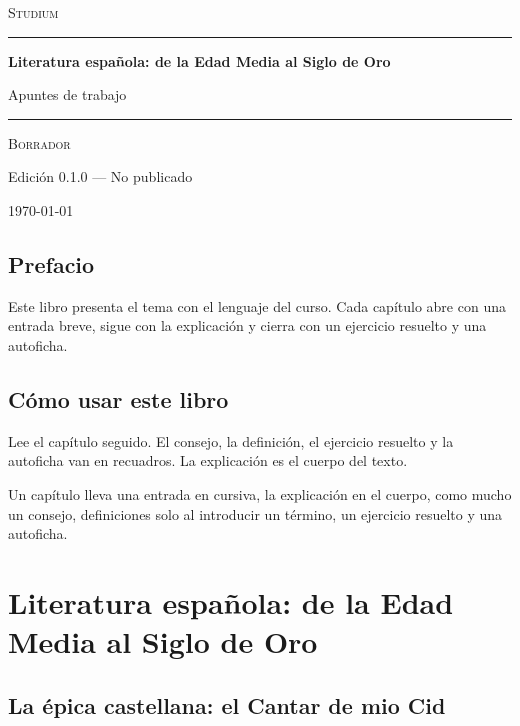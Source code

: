 \documentclass{book}
\begin{document}
\frontmatter
\ifdefined\studiumcustomtitle
\studiumcustomtitle
\else
\thispagestyle{empty}
\setlength{\parindent}{0pt}
\vspace*{0.08\textheight}
{\normalsize\scshape\color{studiumInk} Studium\par}
\vspace{0.55em}
{\color{studiumRule}\rule{\linewidth}{0.9pt}\par}
\vspace{0.16\textheight}
{\raggedright\Huge\bfseries Literatura española: de la Edad Media al Siglo de Oro\par}
\vspace{0.9em}
{\raggedright\Large\color{studiumInk} Apuntes de trabajo\par}
\vfill
{\color{studiumRule}\rule{0.36\linewidth}{0.45pt}\par}
\vspace{1.05em}
{\large\scshape Borrador\par}
\vspace{0.45em}
{\normalsize Edición 0.1.0 --- No publicado\par}
\vspace{0.4em}
{\normalsize\today\par}
\vspace*{0.08\textheight}
\clearpage
\fi
\chapter{Prefacio}
\noindent Este libro presenta el tema con el lenguaje del curso. Cada capítulo abre con una entrada breve, sigue con la explicación y cierra con un ejercicio resuelto y una autoficha.
\chapter{Cómo usar este libro}
\noindent Lee el capítulo seguido. El consejo, la definición, el ejercicio resuelto y la autoficha van en recuadros. La explicación es el cuerpo del texto.

\noindent Un capítulo lleva una entrada en cursiva, la explicación en el cuerpo, como mucho un consejo, definiciones solo al introducir un término, un ejercicio resuelto y una autoficha.
\tableofcontents
\mainmatter
\part{Literatura española: de la Edad Media al Siglo de Oro}

\chapter{La épica castellana: el Cantar de mio Cid}
\label{chap:lit-01}
\end{document}
